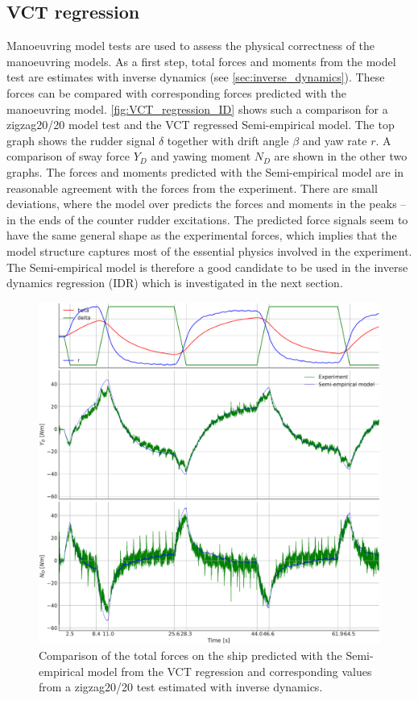 \subsection{VCT regression}
\label{sec:result_VCT_regression}
Manoeuvring model tests are used to assess the physical correctness of the manoeuvring models. As a first step, total forces and moments from the model test are estimates with inverse dynamics (see \autoref{sec:inverse_dynamics}). These forces can be compared with corresponding forces predicted with the manoeuvring model. 
\autoref{fig:VCT_regression_ID} shows such a comparison for a zigzag20/20 model test and the VCT regressed Semi-empirical model. The top graph shows the rudder signal $\delta$ together with drift angle $\beta$ and yaw rate $r$. A comparison of sway force $Y_D$ and yawing moment $N_D$ are shown in the other two graphs. The forces and moments predicted with the Semi-empirical model are in reasonable agreement with the forces from the experiment. There are small deviations, where the model over predicts the forces and moments in the peaks -- in the ends of the counter rudder excitations. The predicted force signals seem to have the same general shape as the experimental forces, which implies that the model structure captures most of the essential physics involved in the experiment. The Semi-empirical model is therefore a good candidate to be used in the inverse dynamics regression (IDR) which is investigated in the next section.
\begin{figure}[h!]
    \includegraphics[width=\textwidth]{figures/result_VCT_regression.VCT_regression_ID.pdf}
    \caption{Comparison of the total forces on the ship predicted with the Semi-empirical model from the VCT regression and corresponding values from a zigzag20/20 test estimated with inverse dynamics.}
    \label{fig:VCT_regression_ID}
\end{figure}
